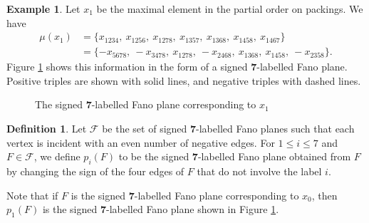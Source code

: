 \documentclass{amsart}
\theoremstyle{plain}
\theoremstyle{definition}
\newtheorem{defn}[theorem]{Definition}
\newtheorem{exa}[theorem]{Example}
\theoremstyle{remark}
\numberwithin{equation}{section}
\newcommand{\calf}{\mathcal{F}}
\newcommand{\seven}{{\mathbf 7}}
\begin{document}
\begin{exa}\label{exa:d7sign}
Let $x_1$ be the maximal element in the partial order on packings. We have \begin{align*}
\mu(x_1) &= \{
x_{1234}, \ 
x_{1256}, \ 
x_{1278}, \ 
x_{1357}, \ 
x_{1368}, \ 
x_{1458}, \ 
x_{1467}
\} \\
&= \{
-x_{5678}, \ 
-x_{3478}, \ 
x_{1278}, \ 
-x_{2468}, \ 
x_{1368}, \ 
x_{1458}, \ 
-x_{2358}
\}.\end{align*} Figure \ref{fig:d7sign} shows this information in the form of a signed $\seven$-labelled
Fano plane. Positive triples are shown with solid lines, and negative triples with dashed lines.

\begin{figure}
\begin{center}
       \caption{The signed $\seven$-labelled Fano plane corresponding to $x_1$}
\label{fig:d7sign}
\end{center}
\end{figure}
\end{exa}

\begin{defn}\label{def:paschop}
Let $\calf$ be the set of signed $\seven$-labelled Fano planes such that each vertex is incident with an
even number of negative edges. For $1 \leq i \leq 7$ and $F \in \calf$, we define $p_i(F)$ to be the signed 
$\seven$-labelled Fano plane obtained from $F$ by changing the sign of the four edges of $F$ that do not involve 
the label $i$.
\end{defn}

Note that if $F$ is the signed $\seven$-labelled Fano plane corresponding to $x_0$, then $p_1(F)$ is the signed 
$\seven$-labelled Fano plane shown in Figure \ref{fig:d7sign}.
\end{document}
